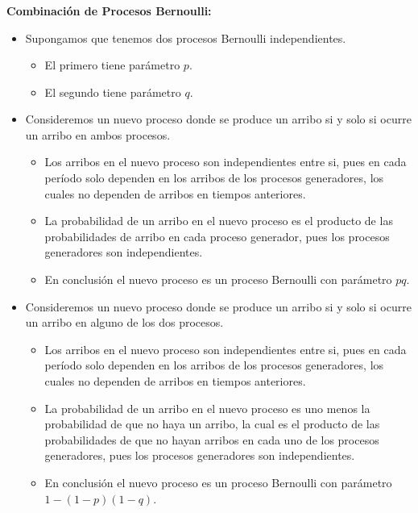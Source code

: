 \documentclass[ 10pt, xcolor = dvipsnames]{beamer}
\begin{document}
\begin{frame}[allowframebreaks]
\frametitle{\insertsection}

\textbf{Combinaci\'on de Procesos Bernoulli:}
\begin{itemize}
\item Supongamos que tenemos dos procesos Bernoulli independientes. 
\begin{itemize}
\item El primero tiene par\'ametro $p$. 
\item El segundo tiene par\'ametro $q$. 
\end{itemize}
\item Consideremos un nuevo proceso donde se produce un arribo si y solo si \linebreak ocurre un arribo en ambos procesos. 
\begin{itemize}
\item Los arribos en el nuevo proceso son independientes entre si, pues en cada per\'iodo solo dependen en los arribos de los procesos generadores, los cuales \linebreak no dependen de arribos en tiempos anteriores. 
\item La probabilidad de un arribo en el nuevo proceso es el producto de las probabilidades de arribo en cada proceso generador, pues los procesos generadores son independientes. 
\item En conclusi\'on el nuevo proceso es un proceso Bernoulli con par\'ametro $pq$. 
\end{itemize}
\framebreak
\item Consideremos un nuevo proceso donde se produce un arribo si y solo si \linebreak ocurre un arribo en alguno de los dos procesos. 
\begin{itemize}
\item Los arribos en el nuevo proceso son independientes entre si, pues en cada per\'iodo solo dependen en los arribos de los procesos generadores, los cuales \linebreak no dependen de arribos en tiempos anteriores. 
\item La probabilidad de un arribo en el nuevo proceso es uno menos la probabilidad de que no haya un arribo, la cual es el producto de las probabilidades de que no hayan arribos en cada uno de los procesos generadores, pues los procesos generadores son independientes. 
\item En conclusi\'on el nuevo proceso es un proceso Bernoulli con par\'ametro $1 - (1-p)(1-q)$. 
\end{itemize}

\end{itemize}

\end{frame}
\end{document}
